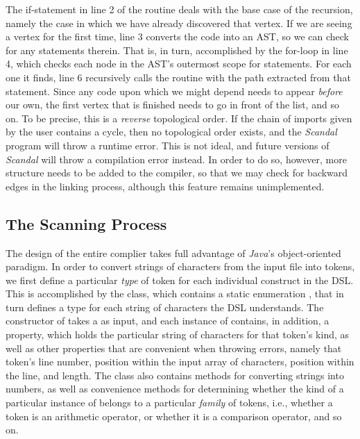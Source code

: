 The if-statement in line 2 of the  routine deals with the base case of the recursion, namely the case in which we have already discovered that vertex. If we are seeing a vertex for the first time, line 3 converts the code into an AST, so we can check for any  statements therein. That is, in turn, accomplished by the for-loop in line 4, which checks each node in the AST's outermost scope for  statements. For each one it finds, line 6 recursively calls the  routine with the path extracted from that  statement. Since any code upon which we might depend needs to appear \emph{before} our own, the first vertex that is finished needs to go in front of the list, and so on. To be precise, this is a \emph{reverse} topological order. If the chain of imports given by the user contains a cycle, then no topological order exists, and the \emph{Scandal} program will throw a runtime error. This is not ideal, and future versions of \emph{Scandal} will throw a compilation error instead. In order to do so, however, more structure needs to be added to the compiler, so that we may check for backward edges in the linking process, although this feature remains unimplemented.

\subsection{The Scanning Process}

The design of the entire complier takes full advantage of \emph{Java}'s object-oriented paradigm. In order to convert strings of characters from the input file into tokens, we first define a particular \emph{type} of token for each individual construct in the DSL. This is accomplished by the  class, which contains a static enumeration , that in turn defines a type for each string of characters the DSL understands. The constructor of  takes a  as input, and each instance of  contains, in addition, a  property, which holds the particular string of characters for that token's kind, as well as other properties that are convenient when throwing errors, namely that token's line number, position within the input array of characters, position within the line, and length. The  class also contains methods for converting strings into numbers, as well as convenience methods for determining whether the kind of a particular instance of  belongs to a particular \emph{family} of tokens, i.e., whether a token is an arithmetic operator, or whether it is a comparison operator, and so on.

